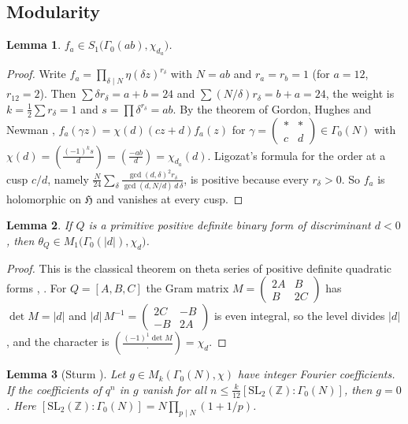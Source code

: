 \documentclass[11pt]{amsart}
\newtheorem{lemma}{Lemma}[section]
\theoremstyle{definition}
\theoremstyle{remark}
\newcommand{\Z}{\mathbb{Z}}
\newcommand{\h}{\mathfrak{H}}
\newcommand{\leg}[2]{\left(\frac{#1}{#2}\right)}
\newcommand{\form}[3]{[#1,#2,#3]}
\begin{document}
\subsection{Modularity}

\begin{lemma}\label{lem:mod}
$f_a\in S_1\bigl(\Gamma_0(ab),\chi_{d_a}\bigr)$.
\end{lemma}

\begin{proof}
Write $f_a=\prod_{\delta\mid N}\eta(\delta z)^{r_\delta}$ with $N=ab$ and $r_a=r_b=1$ (for $a=12$, $r_{12}=2$). Then $\sum\delta r_\delta=a+b=24$ and $\sum (N/\delta)r_\delta=b+a=24$, the weight is $k=\frac12\sum r_\delta=1$ and $s=\prod\delta^{r_\delta}=ab$. By the theorem of Gordon, Hughes and Newman \cite[Thm.~1.64]{Ono}, $f_a(\gamma z)=\chi(d)(cz+d)f_a(z)$ for $\gamma=\left(\begin{smallmatrix}*&*\\c&d\end{smallmatrix}\right)\in\Gamma_0(N)$ with $\chi(d)=\leg{(-1)^k s}{d}=\leg{-ab}{d}=\chi_{d_a}(d)$. Ligozat's formula \cite[Thm.~1.65]{Ono} for the order at a cusp $c/d$, namely $\frac{N}{24}\sum_\delta\frac{\gcd(d,\delta)^2 r_\delta}{\gcd(d,N/d)\,d\,\delta}$, is positive because every $r_\delta>0$. So $f_a$ is holomorphic on $\h$ and vanishes at every cusp.
\end{proof}

\begin{lemma}\label{lem:theta}
If $Q$ is a primitive positive definite binary form of discriminant $d<0$, then $\theta_Q\in M_1\bigl(\Gamma_0(|d|),\chi_d\bigr)$.
\end{lemma}

\begin{proof}
This is the classical theorem on theta series of positive definite quadratic forms \cite[Ch.~10]{Iw}, \cite[Ch.~IX]{Sch}. For $Q=\form{A}{B}{C}$ the Gram matrix $M=\left(\begin{smallmatrix}2A&B\\B&2C\end{smallmatrix}\right)$ has $\det M=|d|$ and $|d|\,M^{-1}=\left(\begin{smallmatrix}2C&-B\\-B&2A\end{smallmatrix}\right)$ is even integral, so the level divides $|d|$, and the character is $\leg{(-1)^{1}\det M}{\cdot}=\chi_d$.
\end{proof}

\begin{lemma}[Sturm \cite{St}]\label{lem:sturm}
Let $g\in M_k(\Gamma_0(N),\chi)$ have integer Fourier coefficients. If the coefficients of $q^n$ in $g$ vanish for all $n\le\frac{k}{12}[\mathrm{SL}_2(\Z):\Gamma_0(N)]$, then $g=0$. Here $[\mathrm{SL}_2(\Z):\Gamma_0(N)]=N\prod_{p\mid N}(1+1/p)$.
\end{lemma}
\end{document}
